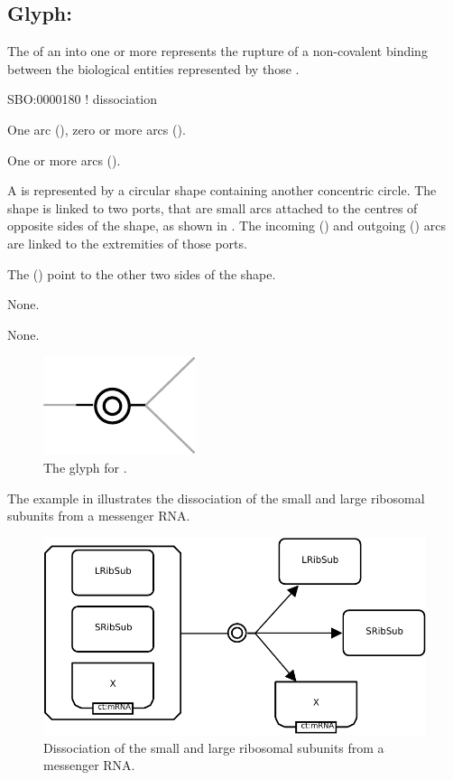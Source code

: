 \subsection{Glyph: }
\label{sec:dissociation}

The  of an  into one or more  represents the rupture of a non-covalent binding between the biological entities represented by those .

\begin{glyphDescription}

\glyphSboTerm
SBO:0000180 ! dissociation

\glyphIncoming
One  arc (), zero or more  arcs ().

\glyphOutgoing
One or more  arcs ().

\glyphContainer
A  is represented by a circular shape containing another concentric circle.
The shape is linked to two ports, that are small arcs attached to the centres of opposite sides of the shape, as shown in .
The incoming  () and outgoing  () arcs are linked to the extremities of those ports.

The  () point to the other two sides of the shape.

\glyphLabel
None.

\glyphAux
None.

\end{glyphDescription}

\begin{figure}[H]
  \centering
  \includegraphics{images/build/dissociation.pdf}
  \caption{The \PD glyph for .}
  \label{fig:dissociation}
\end{figure}

The example in  illustrates the dissociation of the small and large ribosomal subunits from a messenger RNA.

\begin{figure}[H]
  \centering
  \includegraphics[scale = 0.8]{images/build/dissociation_ribosome_example.pdf}
  \caption{Dissociation of the small and large ribosomal subunits from a messenger RNA.}
  \label{fig:dissoc-ribo}
\end{figure}
